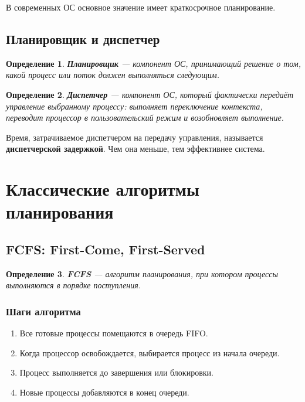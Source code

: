 \documentclass[12pt,a4paper]{article}
\newtheorem{definition}{Определение}
\begin{document}
В современных ОС основное значение имеет краткосрочное планирование.

\subsection{Планировщик и диспетчер}

\begin{definition}
\textbf{Планировщик} --- компонент ОС, принимающий решение о том, какой процесс или поток должен выполняться следующим.
\end{definition}

\begin{definition}
\textbf{Диспетчер} --- компонент ОС, который фактически передаёт управление выбранному процессу: выполняет переключение контекста, переводит процессор в пользовательский режим и возобновляет выполнение.
\end{definition}

Время, затрачиваемое диспетчером на передачу управления, называется \textbf{диспетчерской задержкой}. Чем она меньше, тем эффективнее система.

\section{Классические алгоритмы планирования}

\subsection{FCFS: First-Come, First-Served}

\begin{definition}
\textbf{FCFS} --- алгоритм планирования, при котором процессы выполняются в порядке поступления.
\end{definition}

\subsubsection*{Шаги алгоритма}

\begin{enumerate}
    \item Все готовые процессы помещаются в очередь FIFO.
    \item Когда процессор освобождается, выбирается процесс из начала очереди.
    \item Процесс выполняется до завершения или блокировки.
    \item Новые процессы добавляются в конец очереди.
\end{enumerate}
\end{document}
